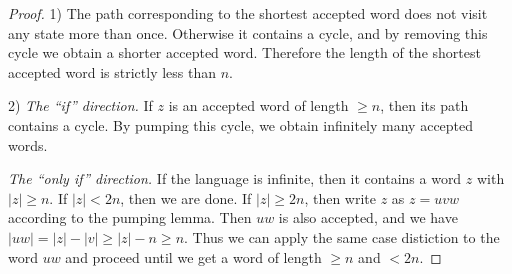 \begin{proof}
1) The path corresponding to the shortest accepted word does not visit any state more than once.
Otherwise it contains a cycle, and by removing this cycle we obtain a shorter accepted word.
Therefore the length of the shortest accepted word is strictly less than $n$.

2) \emph{The ``if'' direction.} If $z$ is an accepted word of length $\ge n$, then its path contains a cycle.
By pumping this cycle, we obtain infinitely many accepted words.

\emph{The ``only if'' direction.} If the language is infinite, then it contains a word $z$ with $|z| \ge n$.
If $|z| < 2n$, then we are done.
If $|z| \ge 2n$, then write $z$ as $z = uvw$ according to the pumping lemma.
Then $uw$ is also accepted, and we have $|uw| = |z| - |v| \ge |z| - n \ge n$.
Thus we can apply the same case distiction to the word $uw$ and proceed until we get a word of length $\ge n$ and $< 2n$.
\end{proof}


